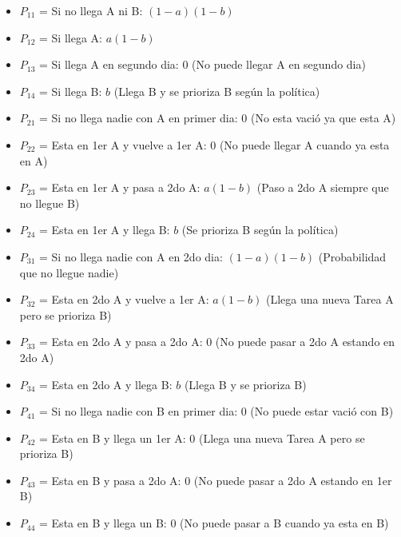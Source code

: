 \documentclass{templateNote}
\begin{document}
\begin{enumerate}[start = 3]
\begin{enumerate}[label = \alph*)]
\begin{center}
            \begin{itemize}
                \item $P_{11}$ = Si no llega A ni B: $(1-a)(1-b)$
                \item $P_{12}$ = Si llega A: $a(1-b)$
                \item $P_{13}$ = Si llega A en segundo dia: $0$ (No puede llegar A en segundo dia)
                \item $P_{14}$ = Si llega B: $b$ (Llega B y se prioriza B según la política) 
                \item $P_{21}$ = Si no llega nadie con A en primer dia: $0$ (No esta vació ya que esta A)
                \item $P_{22}$ = Esta en 1er A y vuelve a 1er A: $0$ (No puede llegar A cuando ya esta en A)
                \item $P_{23}$ = Esta en 1er A y pasa a 2do A: $a(1-b)$ (Paso a 2do A siempre que no llegue B)
                \item $P_{24}$ = Esta en 1er A y llega B: $b$ (Se prioriza B según la política) 
                \item $P_{31}$ = Si no llega nadie con A en 2do dia: $(1-a)(1-b)$ (Probabilidad que no llegue nadie)
                \item $P_{32}$ = Esta en 2do A y vuelve a 1er A: $a(1-b)$ (Llega una nueva Tarea A pero se prioriza B)
                \item $P_{33}$ = Esta en 2do A y pasa a 2do A: $0$ (No puede pasar a 2do A estando en 2do A)
                \item $P_{34}$ = Esta en 2do A y llega B: $b$ (Llega B y se prioriza B)
                \item $P_{41}$ = Si no llega nadie con B en primer dia: $0$ (No puede estar vació con B)
                \item $P_{42}$ = Esta en B y llega un 1er A: $0$ (Llega una nueva Tarea A pero se prioriza B)
                \item $P_{43}$ = Esta en B y pasa a 2do A: $0$ (No puede pasar a 2do A estando en 1er B)
                \item $P_{44}$ = Esta en B y llega un B: $0$ (No puede pasar a B cuando ya esta en B)
            \end{itemize}


\end{center}
\end{enumerate}
\end{enumerate}
\end{document}
